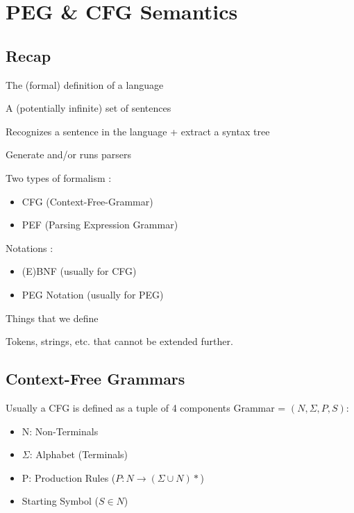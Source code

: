 \chapter{PEG \& CFG Semantics}
\label{chap:peg_cfg_semantics}

\section{Recap}
    \theoremstyle{definition}
    \begin{definition}[Grammar]
        The (formal) definition of a language
    \end{definition}
    \theoremstyle{definition}
    \begin{definition}[Language]
        A (potentially infinite) set of sentences
    \end{definition}
    \theoremstyle{definition}
    \begin{definition}[Parser]
        Recognizes a sentence in the language + extract a syntax tree
    \end{definition}
    \theoremstyle{definition}
    \begin{definition}
        Generate and/or runs parsers
    \end{definition}
    Two types of formalism : 
    \begin{itemize}
        \item CFG (Context-Free-Grammar)
        \item PEF (Parsing Expression Grammar)
    \end{itemize}
    Notations : 
        \begin{itemize}
            \item (E)BNF (usually for CFG)
            \item PEG Notation (usually for PEG)
        \end{itemize}
    \theoremstyle{definition}
    \begin{definition}
        Things that we define
    \end{definition}
    \theoremstyle{definition}
    \begin{definition}[Terminals]
        Tokens, strings, etc. that cannot be extended further.
    \end{definition}

\section{Context-Free Grammars}
    Usually a CFG is defined as a tuple of 4 components Grammar = $(N, \Sigma, P, S)$: 
        \begin{itemize}
            \item N: Non-Terminals
            \item $\Sigma$: Alphabet (Terminals)
            \item P: Production Rules ($P: N \rightarrow (\Sigma \cup N)*$)
            \item Starting Symbol ($S \in N$)
        \end{itemize}

